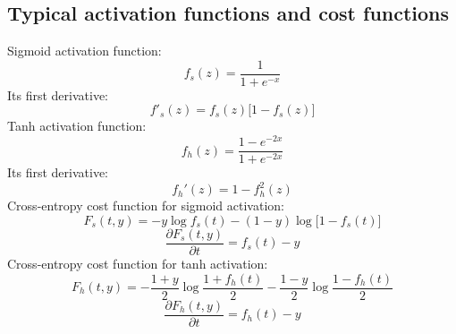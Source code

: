 \documentclass{bioinfo}
\begin{document}
\begin{methods}
\subsection{Typical activation functions and cost functions}

Sigmoid activation function:
\[
f_s(z)=\frac{1}{1+e^{-x}}
\]
Its first derivative:
\[
f'_s(z)=f_s(z)\big[1-f_s(z)\big]
\]
Tanh activation function:
\[
f_h(z)=\frac{1-e^{-2x}}{1+e^{-2x}}
\]
Its first derivative:
\[
f_h'(z)=1-f_h^2(z)
\]
Cross-entropy cost function for sigmoid activation:
\[
F_s(t,y)=-y\log f_s(t)-(1-y)\log\big[1-f_s(t)\big]
\]
\[
\frac{\partial F_s(t,y)}{\partial t}=f_s(t)-y
\]
Cross-entropy cost function for tanh activation:
\[
F_h(t,y)=-\frac{1+y}{2}\log\frac{1+f_h(t)}{2}-\frac{1-y}{2}\log\frac{1-f_h(t)}{2}
\]
\[
\frac{\partial F_h(t,y)}{\partial t}=f_h(t)-y
\]

\end{methods}
\end{document}
